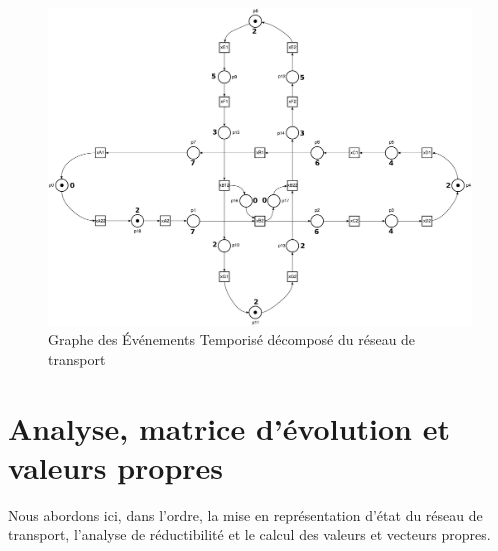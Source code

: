\begin{figure}[!ht]
\centering
\includegraphics[width = .8\textwidth]{./I/images/train_decompose.pdf}
\caption{\label{fig:get_train_decompo} Graphe des Événements Temporisé décomposé du réseau de transport }
\end{figure}
\section{Analyse, matrice d'évolution et valeurs propres}
Nous abordons ici, dans l'ordre, la mise en représentation d'état du réseau de transport, l'analyse de réductibilité et le calcul des valeurs et vecteurs propres. 

